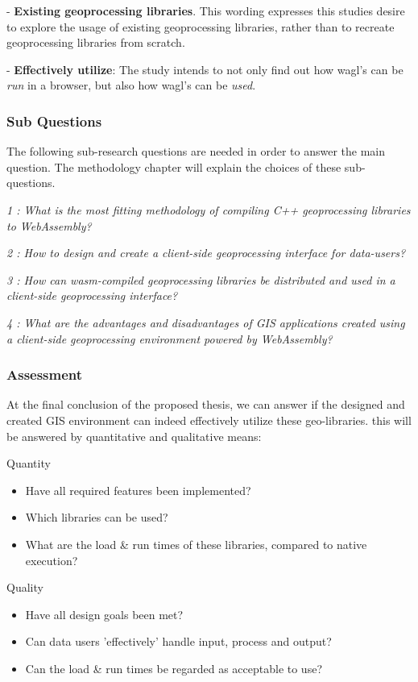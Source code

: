 - \textbf{Existing geoprocessing libraries}. This wording expresses this studies desire to explore the usage of existing geoprocessing libraries, rather than to recreate geoprocessing libraries from scratch.

- \textbf{Effectively utilize}: The study intends to not only find out how \ac{wagl}'s can be \textit{run} in a browser, but also how \ac{wagl}'s can be \textit{used}. 


\subsubsection*{Sub Questions}

The following sub-research questions are needed in order to answer the main question. The methodology chapter will explain the choices of these sub-questions. 

\textit{1 : What is the most fitting methodology of compiling C++ geoprocessing libraries to WebAssembly?}

\textit{2 : How to design and create a client-side geoprocessing interface for data-users?}

\textit{3 : How can wasm-compiled geoprocessing libraries be distributed and used in a client-side geoprocessing interface?}

\textit{4 : What are the advantages and disadvantages of GIS applications created using a client-side geoprocessing environment powered by WebAssembly?}


\subsubsection*{Assessment}

At the final conclusion of the proposed thesis, we can answer if the designed and created GIS environment can indeed effectively utilize these geo-libraries.
this will be answered by quantitative and qualitative means:

Quantity
\begin{itemize}
    \item Have all required features been implemented?
    \item Which libraries can be used?
    \item What are the load \& run times of these libraries, compared to native execution?
\end{itemize} 

Quality
\begin{itemize}
    \item Have all design goals been met?
    \item Can data users 'effectively' handle input, process and output?
    \item Can the load \& run times be regarded as acceptable to use? 
\end{itemize} 


